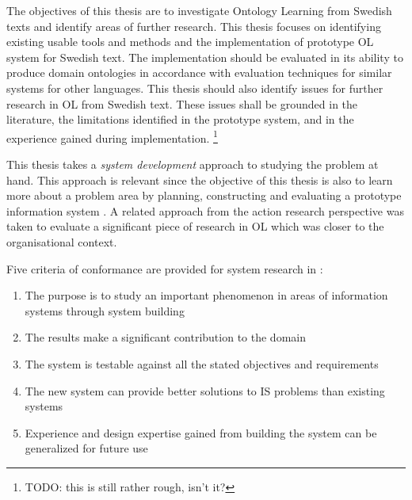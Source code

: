 \documentclass[a4paper]{report}
\newcommand{\todo}[1]{\footnote{{\color{red} TODO: #1}}}
\begin{document}
The objectives of this thesis are to investigate Ontology Learning from Swedish texts and identify areas of further research.
This thesis focuses on identifying existing usable tools and methods and the implementation of prototype OL system for Swedish text.
The implementation should be evaluated in its ability to produce domain ontologies in accordance with evaluation techniques for similar systems for other languages.
This thesis should also identify issues for further research in OL from Swedish text.
These issues shall be grounded in the literature, the limitations identified in the prototype system, and in the experience gained during implementation. \todo{this is still rather rough, isn't it?}

This thesis takes a \emph{system development} approach to studying the problem at hand.
This approach is relevant since the objective of this thesis is also to learn more about a problem area by planning, constructing and evaluating a prototype information system \cite{NunamakerChen90SDResearch}.
A related approach from the action research perspective\cite{BursteinGregor99SDResearch} was taken to evaluate a significant piece of research in OL which was closer to the organisational context\cite{Blomqvist09Thesis}.

Five criteria of conformance are provided for system research in \cite{NunamakerChen90SDResearch}:
\begin{enumerate}
\item The purpose is to study an important phenomenon in areas of information systems through
system building
\item The results make a significant contribution to the domain
\item The system is testable against all the stated objectives and requirements
\item The new system can provide better solutions to IS problems than existing systems
\item Experience and design expertise gained from building the system can be generalized for future use
\end{enumerate}
\end{document}

